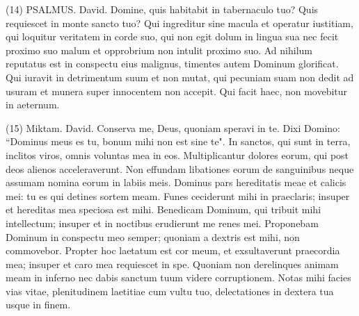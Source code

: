 \begin{biblechapter}  (14) 
\verse  PSALMUS. David. Domine, quis habitabit in tabernaculo tuo? Quis requiescet in monte sancto tuo? 
\verse Qui ingreditur sine macula et operatur iustitiam, qui loquitur veritatem in corde suo, 
\verse qui non egit dolum in lingua sua nec fecit proximo suo malum et opprobrium non intulit proximo suo. 
\verse Ad nihilum reputatus est in conspectu eius malignus, timentes autem Dominum glorificat. Qui iuravit in detrimentum suum et non mutat, 
\verse qui pecuniam suam non dedit ad usuram et munera super innocentem non accepit. Qui facit haec, non movebitur in aeternum. 
\end{biblechapter}

\begin{biblechapter}  (15) 
\verse  Miktam. David. Conserva me, Deus, quoniam speravi in te. 
\verse Dixi Domino: “Dominus meus es tu, bonum mihi non est sine te". 
\verse In sanctos, qui sunt in terra, inclitos viros, omnis voluntas mea in eos. 
\verse Multiplicantur dolores eorum, qui post deos alienos acceleraverunt. Non effundam libationes eorum de sanguinibus neque assumam nomina eorum in labiis meis. 
\verse Dominus pars hereditatis meae et calicis mei: tu es qui detines sortem meam. 
\verse Funes ceciderunt mihi in praeclaris; insuper et hereditas mea speciosa est mihi. 
\verse Benedicam Dominum, qui tribuit mihi intellectum; insuper et in noctibus erudierunt me renes mei. 
\verse Proponebam Dominum in conspectu meo semper; quoniam a dextris est mihi, non commovebor. 
\verse Propter hoc laetatum est cor meum, et exsultaverunt praecordia mea; insuper et caro mea requiescet in spe. 
\verse Quoniam non derelinques animam meam in inferno nec dabis sanctum tuum videre corruptionem. 
\verse Notas mihi facies vias vitae, plenitudinem laetitiae cum vultu tuo, delectationes in dextera tua usque in finem. 
\end{biblechapter}

